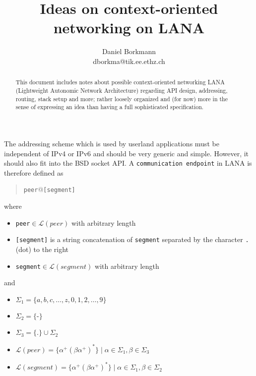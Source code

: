 \documentclass[times,10pt,twocolumn]{article}
\begin{document}
\title{
Ideas on context-oriented networking on LANA\\\smallskip [DRAFT]
}

\author{
Daniel Borkmann\\
dborkma@tik.ee.ethz.ch\\
}

\maketitle
\thispagestyle{empty}

\begin{abstract}
This document includes notes about possible context-oriented networking 
LANA (Lightweight Autonomic Network Architecture) regarding API design, 
addressing, routing, stack setup and more; rather loosely organized and 
(for now) more in the sense of expressing an idea than having a full 
sophisticated specification.
\end{abstract}

\label{addr}
The addressing scheme which is used by userland applications must be
independent of IPv4 or IPv6 and should be very generic and simple.
However, it should also fit into the BSD socket API. A \texttt{communication 
endpoint} in LANA is therefore defined as
\begin{quote}\texttt{peer}@\texttt{[segment]}\end{quote}
where
\begin{itemize}
	\setlength{\itemsep}{-1mm}
	\item \texttt{peer}$\in\mathcal{L}(peer)$ with arbitrary length
	\item \texttt{[segment]} is a string concatenation of
	      \texttt{segment} separated by the character \texttt{.} (dot) to the right
	\item \texttt{segment}$\in\mathcal{L}(segment)$ with arbitrary length
\end{itemize}
and
\begin{itemize}
	\setlength{\itemsep}{-1mm}
	\item $\Sigma_{1} =\{a,b,c,\ldots,z,0,1,2,\ldots,9\}$
	\item $\Sigma_{2} =\{$-$\}$
	\item $\Sigma_{3} =\{.\} \cup \Sigma_{2}$
	\item $\mathcal{L}(peer)=\{\alpha^{+}(\beta\alpha^{+})^{*}\} \;\vert\; \alpha\in\Sigma_{1},\beta\in\Sigma_{3}$
	\item $\mathcal{L}(segment)=\{\alpha^{+}(\beta\alpha^{+})^{*}\} \;\vert\; \alpha\in\Sigma_{1},\beta\in\Sigma_{2}$
\end{itemize}
\end{document}
